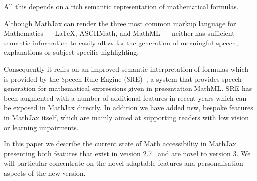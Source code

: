 \documentclass{sig-alternate}
\begin{document}
All this depends on a rich semantic representation of mathematical formulas.

Although MathJax can render the three most common markup language for
Mathematics --- {\LaTeX}, ASCIIMath, and MathML --- neither has sufficient
semantic information to easily allow for the generation of meaningful speech,
explanations or subject specific highlighting.

Consequently it relies on an improved semantic interpretation of formulas which
is provided by the Speech Rule Engine (SRE)~\cite{}, a system that provides
speech generation for mathematical expressions given in presentation MathML.
SRE has been augmented with a number of additional features in recent years
which can be exposed in MathJax directly.  In addition we have added new,
bespoke features in MathJax itself, which are mainly aimed at supporting readers
with low vision or learning impairments.

In this paper we describe the current state of Math accessibility in MathJax
presenting both features that exist in version 2.7~\cite{cervone2016towards} and
are novel to version 3. We will particular concentrate on the novel adaptable
features and personalisation aspects of the new version.
\end{document}
